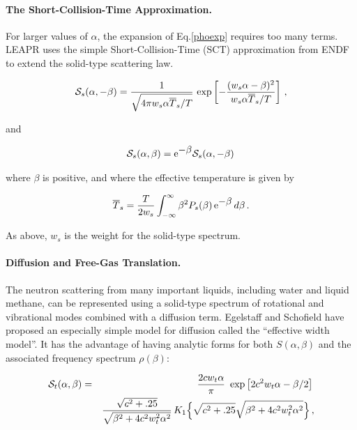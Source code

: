 \paragraph{The Short-Collision-Time Approximation.}
For larger values of $\alpha$, the expansion of Eq.\ref{phoexp} requires
too many terms.  LEAPR uses the simple Short-Collision-Time (SCT)
approximation from ENDF to extend the solid-type scattering law.

\begin{equation}
   {\cal S}_s(\alpha,-\beta)=\frac{1}{\sqrt{4\pi w_s\alpha
      \overline{T}_s/T}}\,
      \exp\left[-\frac{(w_s\alpha-\beta)^2}{w_s\alpha
      \overline{T}_s/T}\right]\,,
\end{equation}

\noindent
and

\begin{equation}
   {\cal S}_s(\alpha,\beta)={\rm e}^{\textstyle -\beta}{\cal S}_s(\alpha,-\beta)\,
\end{equation}

\noindent
where $\beta$ is positive, and
where the effective temperature is given by

\begin{equation}
   \overline{T}_s = \frac{T}{2 w_s}
       \int_{-\infty}^\infty\beta^2 P_s(\beta)\,{\rm e}^{\textstyle -\beta}\,d\beta\,.
\end{equation}

\noindent
As above, $w_s$ is the weight for the solid-type spectrum.

\paragraph{Diffusion and Free-Gas Translation.}
The neutron scattering from many important liquids, including water
and liquid methane, can be represented using a solid-type spectrum
of rotational and vibrational modes combined with a
diffusion term.  Egelstaff and Schofield have
proposed an especially simple model for diffusion called the
``effective width model''.  It has the advantage of having
analytic forms for both $S(\alpha,\beta)$ and the
associated frequency spectrum $\rho(\beta)$:

\begin{eqnarray}
   {\cal S}_t(\alpha,\beta)&=&\frac{2 c w_t\alpha}{\pi}\,
       \,\exp\left[2 c^2 w_t\alpha-\beta/2\right]\, \nonumber\\
     & &\frac{\sqrt{c^2+.25}}{\sqrt{\beta^2+4 c^2 w_t^2\alpha^2}}\,
     K_1\Bigl\{\sqrt{c^2+.25}\sqrt{\beta^2+4 c^2 w_t^2 \alpha^2}
     \Bigr\}\,,
\end{eqnarray}
\vspace{0.5 pt}


